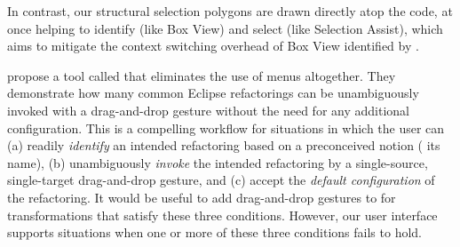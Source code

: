 In contrast, our structural selection polygons are drawn
directly atop the code, at once helping to identify (like Box View) and select (like
Selection Assist), which aims to mitigate the context switching
overhead of Box View identified by \citet{Murphy-Hill-ICSE2008}.






\label{sec:discussion-related-dndr}

\citet{DNDRefactoring} propose a tool called \dndr{} that eliminates the use
of menus altogether. They demonstrate how many common Eclipse
refactorings can be unambiguously invoked with a drag-and-drop gesture
without the need for any additional configuration.
This is a compelling workflow for situations
in which the user can (a) readily \emph{identify} an intended
refactoring based on a preconceived notion (\eg{} its name), (b)
unambiguously \emph{invoke} the intended refactoring by a single-source,
single-target drag-and-drop gesture, and (c) accept the \emph{default configuration}
of the refactoring.
It would be useful to add drag-and-drop gestures to \deuce{}
for transformations that satisfy these three conditions.
%
However, our user interface supports situations when one or more
of these three conditions fails to hold.

